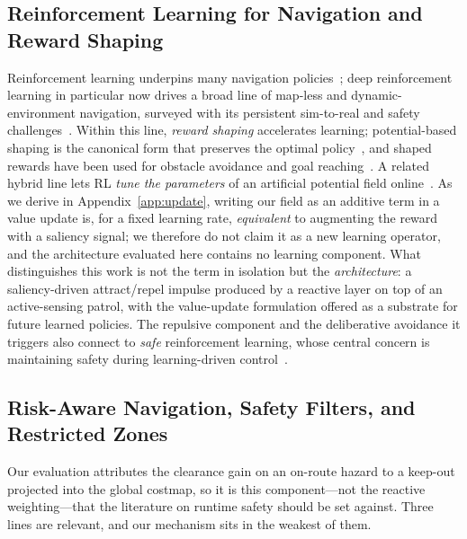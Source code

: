 \subsection{Reinforcement Learning for Navigation and Reward Shaping}
Reinforcement learning underpins many navigation policies~\cite{suttonbarto2018};
deep reinforcement learning in particular now drives a broad line of map-less and
dynamic-environment navigation, surveyed with its persistent sim-to-real and
safety challenges~\cite{drlrobotics2024survey}. Within this line, \emph{reward
shaping} accelerates learning; potential-based shaping is the canonical form that
preserves the optimal policy~\cite{ng1999}, and shaped rewards have been used for
obstacle avoidance and goal reaching~\cite{zhang2020reward}. A related hybrid line lets RL \emph{tune the
parameters} of an artificial potential field online~\cite{zhang2023apf}. As we
derive in Appendix~\ref{app:update}, writing our field as an additive term in a
value update is, for a fixed learning rate, \emph{equivalent} to augmenting the
reward with a saliency signal; we therefore do not claim it as a new learning
operator, and the architecture evaluated here contains no learning component. What
distinguishes this work is not the term in isolation but the \emph{architecture}:
a saliency-driven attract/repel impulse produced by a reactive layer on top of an
active-sensing patrol, with the value-update formulation offered as a substrate
for future learned policies. The repulsive component and the deliberative
avoidance it triggers also connect to \emph{safe} reinforcement learning, whose
central concern is maintaining safety during learning-driven
control~\cite{brunke2022safe}.

\subsection{Risk-Aware Navigation, Safety Filters, and Restricted Zones}
Our evaluation attributes the clearance gain on an on-route hazard to a keep-out
projected into the global costmap, so it is this component---not the reactive
weighting---that the literature on runtime safety should be set against. Three lines
are relevant, and our mechanism sits in the weakest of them.


